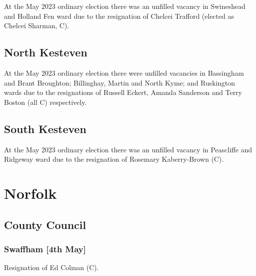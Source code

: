 \documentclass[a4paper,openany]{book}
\begin{document}
\begin{resultsiii}
At the May 2023 ordinary election there was an unfilled vacancy in Swineshead and Holland Fen ward due to the resignation of Chelcei Trafford (elected as Chelcei Sharman, C).%

\subsection*{North Kesteven}

At the May 2023 ordinary election there were unfilled vacancies in Bassingham and Brant Broughton; Billinghay, Martin and North Kyme; and Ruskington wards due to the resignations of Russell Eckert, Amanda Sanderson and Terry Boston (all C) respectively.%
%
%

\subsection*{South Kesteven}

At the May 2023 ordinary election there was an unfilled vacancy in Peascliffe and Ridgeway ward due to the resignation of Rosemary Kaberry-Brown (C).%

\section{Norfolk}

\subsection*{County Council}

\subsubsection*{Swaffham \hspace*{\fill}\nolinebreak[1]%
	\enspace\hspace*{\fill}
	[4th May]}


Resignation of Ed Colman (C).


\end{resultsiii}
\end{document}
